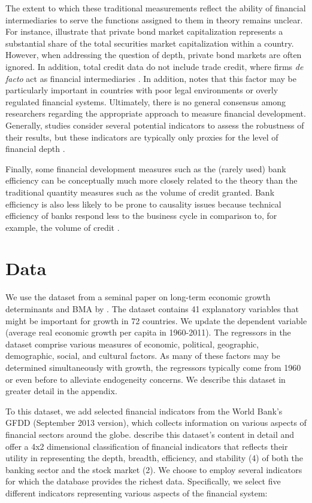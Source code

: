 \begin{refsection}
The extent to which these traditional measurements reflect the ability of financial intermediaries to serve the functions assigned to them in theory remains unclear. For instance, \textcite{Cihaketal2013} illustrate that private bond market capitalization represents a substantial share of the total securities market capitalization within a country. However, when addressing the question of depth, private bond markets are often ignored. In addition, total credit data do not include trade credit, where firms \textit{de facto} act as financial intermediaries \parencite{PetersenRajan1997}. In addition, \textcite{Levine2005} notes that this factor may be particularly important in countries with poor legal environments or overly regulated financial systems. Ultimately, there is no general consensus among researchers regarding the appropriate approach to measure financial development. Generally, studies consider several potential indicators to assess the robustness of their results, but these indicators are typically only proxies for the level of financial depth \parencite{Valickovaetal2014}.

Finally, some financial development measures such as the (rarely used) bank efficiency can be conceptually much more closely related to the theory \parencite{Pagano1993} than the traditional quantity measures such as the volume of credit granted. Bank efficiency is also less likely to be prone to causality issues because technical efficiency of banks respond less to the business cycle in comparison to, for example, the volume of credit \parencite{KoetterWedow2010}.

\section{Data}
\label{ch2sec:data}
We use the dataset from a seminal paper on long-term economic growth determinants and \ac{BMA} by \textcite{Fernandezetal2001}. The dataset contains 41 explanatory variables that might be important for growth in 72 countries. We update the dependent variable (average real economic growth per capita in 1960-2011). The regressors in the dataset comprise various measures of economic, political, geographic, demographic, social, and cultural factors. As many of these factors may be determined simultaneously with growth, the regressors typically come from 1960 or even before to alleviate endogeneity concerns. We describe this dataset in greater detail in the appendix.

To this dataset, we add selected financial indicators from the World Bank's \ac{GFDD} (September 2013 version), which collects information on various aspects of financial sectors around the globe. \textcite{Cihaketal2013} describe this dataset's content in detail and offer a 4x2 dimensional classification of financial indicators that reflects their utility in representing the depth, breadth, efficiency, and stability (4) of both the banking sector and the stock market (2). We choose to employ several indicators for which the database provides the richest data. Specifically, we select five different indicators representing various aspects of the financial system:


\end{refsection}
